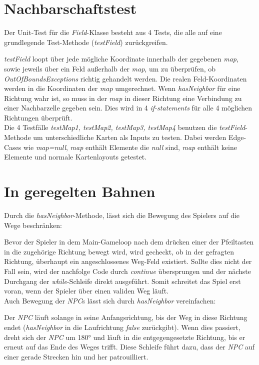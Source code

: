 \documentclass{pi1}
\begin{document}
\newpage
\section{Nachbarschaftstest}
Der Unit-Test für die \textit{Field}-Klasse besteht aus 4 Tests, die alle auf eine grundlegende Test-Methode (\textit{testField}) zurückgreifen.

\textit{testField} loopt über jede mögliche Koordinate innerhalb der gegebenen \textit{map}, sowie jeweils über ein Feld außerhalb der \textit{map}, um zu überprüfen, ob \textit{OutOfBoundsExceptions} richtig gehandelt werden.
Die realen Feld-Koordinaten werden in die Koordinaten der \textit{map} umgerechnet. Wenn \textit{hasNeighbor} für eine Richtung wahr ist, so muss in der \textit{map} in dieser Richtung eine Verbindung zu einer Nachbarzelle gegeben sein. Dies wird in 4 \textit{if-statements} für alle 4 möglichen Richtungen überprüft.\\

Die 4 Testfälle \textit{testMap1, testMap2, testMap3, testMap4} benutzen die \textit{testField}-Methode um unterschiedliche Karten als Inputs zu testen. Dabei werden Edge-Cases wie \textit{map=null}, \textit{map} enthält Elemente die \textit{null} sind, \textit{map} enthält keine Elemente und normale Kartenlayouts getestet.

\section{In geregelten Bahnen}
Durch die \textit{hasNeighbor}-Methode, lässt sich die Bewegung des Spielers auf die Wege beschränken:

Bevor der Spieler in dem Main-Gameloop nach dem drücken einer der Pfeiltasten in die zugehörige Richtung bewegt wird, wird gecheckt, ob in der gefragten Richtung, überhaupt ein angeschlossenes Weg-Feld existiert. Sollte dies nicht der Fall sein, wird der nachfolge Code durch \textit{continue} übersprungen und der nächste Durchgang der \textit{while}-Schleife direkt ausgeführt. Somit schreitet das Spiel erst voran, wenn der Spieler über einen validen Weg läuft.\\

Auch Bewegung der \textit{NPC}s lässt sich durch \textit{hasNeighbor} vereinfachen:

Der \textit{NPC} läuft solange in seine Anfangsrichtung, bis der Weg in diese Richtung endet (\textit{hasNeighbor} in die Laufrichtung \textit{false} zurückgibt). Wenn dies passiert, dreht sich der \textit{NPC} um 180° und läuft in die entgegengesetzte Richtung, bis er erneut auf das Ende des Weges trifft. Diese Schleife führt dazu, dass der \textit{NPC} auf einer gerade Strecken hin und her patrouilliert.
\end{document}

